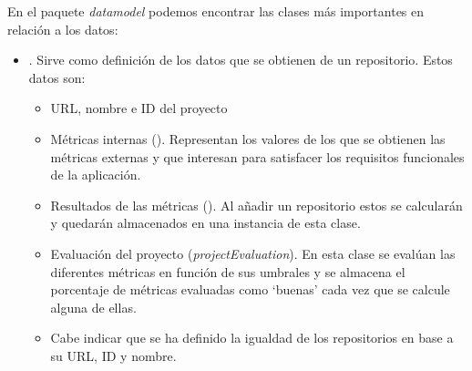 En el paquete \textit{datamodel} podemos encontrar las clases más importantes en relación a los datos:
\begin{itemize}
	\item {}. Sirve como definición de los datos que se obtienen de un repositorio. Estos datos son:
	\begin{itemize}
		\item URL, nombre e ID del proyecto
		\item Métricas internas (). Representan los valores de los que se obtienen las métricas externas y que interesan para satisfacer los requisitos funcionales de la aplicación.
		\item Resultados de las métricas (). Al añadir un repositorio estos se calcularán y quedarán almacenados en una instancia de esta clase.
		\item Evaluación del proyecto (\textit{projectEvaluation}). En esta clase se evalúan las diferentes métricas en función de sus umbrales y se almacena el porcentaje de métricas evaluadas como `buenas' cada vez que se calcule alguna de ellas.
		\item Cabe indicar que se ha definido la igualdad de los repositorios en base a su URL, ID y nombre.


\end{itemize}
\end{itemize}
